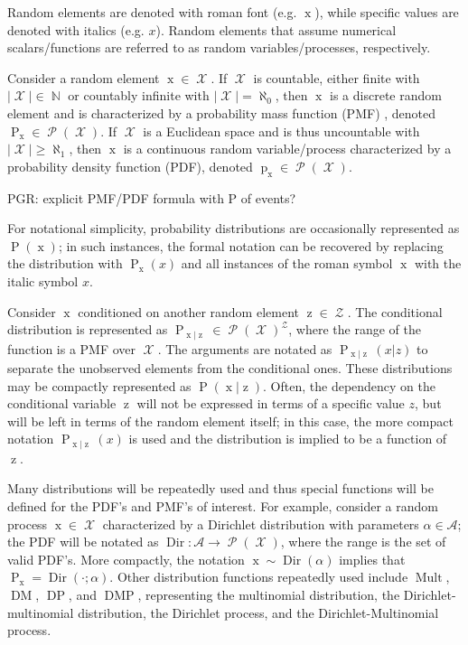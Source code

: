 \documentclass[12pt]{report}
\DeclareMathOperator{\xrm}{\mathrm{x}}
\DeclareMathOperator{\zrm}{\mathrm{z}}
\DeclareMathOperator{\Prm}{\mathrm{P}}
\DeclareMathOperator{\prm}{\mathrm{p}}
\DeclareMathOperator{\Xcal}{\mathcal{X}}
\DeclareMathOperator{\Zcal}{\mathcal{Z}}
\DeclareMathOperator{\Pcal}{\mathcal{P}}
\DeclareMathOperator{\Nbb}{\mathbb{N}}
\DeclareMathOperator{\Dir}{\mathrm{Dir}}
\DeclareMathOperator{\DM}{\mathrm{DM}}
\DeclareMathOperator{\Mult}{\mathrm{Mult}}
\DeclareMathOperator{\DP}{\mathrm{DP}}
\DeclareMathOperator{\DMP}{\mathrm{DMP}}
\begin{document}
Random elements are denoted with roman font (e.g. $\xrm$), while specific values are denoted with italics (e.g. $x$). Random elements that assume numerical scalars/functions are referred to as random variables/processes, respectively.

Consider a random element $\xrm \in \Xcal$. If $\Xcal$ is countable, either finite with $|\Xcal| \in \Nbb$ or countably infinite with $|\Xcal| = \aleph_0$, then $\xrm$ is a discrete random element and is characterized by a probability mass function (PMF) \cite {papoulis}, denoted $\Prm_{\xrm} \in \Pcal(\Xcal)$. If $\Xcal$ is a Euclidean space and is thus uncountable with $|\Xcal| \geq \aleph_1$, then $\xrm$ is a continuous random variable/process characterized by a probability density function (PDF), denoted $\prm_{\xrm} \in \Pcal(\Xcal)$.

PGR: explicit PMF/PDF formula with P of events?

For notational simplicity, probability distributions are occasionally represented as $\Prm(\xrm)$; in such instances, the formal notation can be recovered by replacing the distribution with $\Prm_{\xrm}(x)$ and all instances of the roman symbol $\xrm$ with the italic symbol $x$. 

Consider $\xrm$ conditioned on another random element $\zrm \in \Zcal$. The conditional distribution is represented as $\Prm_{\xrm | \zrm} \in \Pcal(\Xcal)^{\Zcal}$, where the range of the function is a PMF over $\Xcal$. The arguments are notated as $\Prm_{\xrm | \zrm}(x|z)$ to separate the unobserved elements from the conditional ones. These distributions may be compactly represented as $\Prm(\xrm|\zrm)$. Often, the dependency on the conditional variable $\zrm$ will not be expressed in terms of a specific value $z$, but will be left in terms of the random element itself; in this case, the more compact notation $\Prm_{\xrm | \zrm}(x)$ is used and the distribution is implied to be a function of $\zrm$.

Many distributions will be repeatedly used and thus special functions will be defined for the PDF's and PMF's of interest. For example, consider a random process $\xrm \in \Xcal$ characterized by a Dirichlet distribution with parameters $\alpha \in \mathcal{A}$; the PDF will be notated as $\Dir : \mathcal{A} \to \Pcal(\Xcal)$, where the range is the set of valid PDF's. More compactly, the notation $\xrm \sim \Dir(\alpha)$ implies that $\Prm_{\xrm} = \Dir(\cdot ; \alpha)$. Other distribution functions repeatedly used include $\Mult$, $\DM$, $\DP$, and $\DMP$, representing the multinomial distribution, the Dirichlet-multinomial distribution, the Dirichlet process, and the Dirichlet-Multinomial process.
\end{document}
